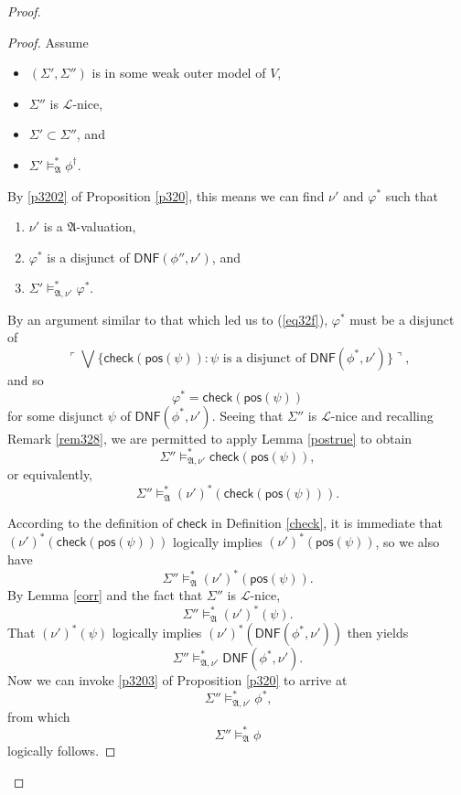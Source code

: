\documentclass[12pt, twoside]{memoir}
\numberwithin{equation}{section}
\theoremstyle{definition}
\theoremstyle{remark}
\theoremstyle{definition}
\theoremstyle{definition}
\theoremstyle{definition}
\theoremstyle{remark}
\begin{document}
\begin{proof}
\begin{enumerate}[label=Case \arabic*:, leftmargin=50pt]
    \begin{proof}
    Assume 
    \begin{itemize}
        \item $(\Sigma', \Sigma'')$ is in some weak outer model of $V$,
        \item $\Sigma''$ is $\mathcal{L}$-nice,
        \item $\Sigma' \subset \Sigma''$, and 
        \item $\Sigma' \models^{*}_{\mathfrak{A}} \phi^{\dagger}$.
    \end{itemize} 
    By \ref{p3202} of Proposition \ref{p320}, this means we can find $\nu'$ and $\varphi^*$ such that
    \begin{enumerate}[label=(\alph*)]
        \item $\nu'$ is a $\mathfrak{A}$-valuation, 
        \item $\varphi^*$ is a disjunct of $\mathsf{DNF}(\phi'', \nu')$, and
        \item $\Sigma' \models^{*}_{\mathfrak{A}, \nu'} \varphi^*$.
    \end{enumerate}
    By an argument similar to that which led us to (\ref{eq32f}), $\varphi^*$ must be a disjunct of 
    \begin{equation*}
        \ulcorner \bigvee \{\mathsf{check}(\mathsf{pos}(\psi)) : \psi \text{ is a disjunct of } \mathsf{DNF}(\phi^*, \nu')\} \urcorner \text{,}
    \end{equation*}
    and so 
    \begin{equation*}
        \varphi^* = \mathsf{check}(\mathsf{pos}(\psi))
    \end{equation*}
    for some disjunct $\psi$ of $\mathsf{DNF}(\phi^*, \nu')$. Seeing that $\Sigma''$ is $\mathcal{L}$-nice and recalling Remark \ref{rem328}, we are permitted to apply Lemma \ref{postrue} to obtain $$\Sigma'' \models^{*}_{\mathfrak{A}, \nu'} \mathsf{check}(\mathsf{pos}(\psi)),$$ or equivalently, $$\Sigma'' \models^{*}_{\mathfrak{A}} (\nu')^*(\mathsf{check}(\mathsf{pos}(\psi))).$$
    
    According to the definition of $\mathsf{check}$ in Definition \ref{check}, it is immediate that $(\nu')^*(\mathsf{check}(\mathsf{pos}(\psi)))$ logically implies $(\nu')^*(\mathsf{pos}(\psi))$, so we also have $$\Sigma'' \models^{*}_{\mathfrak{A}} (\nu')^*(\mathsf{pos}(\psi)).$$ By Lemma \ref{corr} and the fact that $\Sigma''$ is $\mathcal{L}$-nice, $$\Sigma'' \models^{*}_{\mathfrak{A}} (\nu')^*(\psi).$$ That $(\nu')^*(\psi)$ logically implies $(\nu')^*(\mathsf{DNF}(\phi^*, \nu'))$ then yields $$\Sigma'' \models^{*}_{\mathfrak{A}, \nu'} \mathsf{DNF}(\phi^*, \nu').$$ Now we can invoke \ref{p3203} of Proposition \ref{p320} to arrive at 
    \begin{equation*}
        \Sigma'' \models^{*}_{\mathfrak{A}, \nu'} \phi^* \text{,}
    \end{equation*}
    from which 
    \begin{equation*}
        \Sigma'' \models^{*}_{\mathfrak{A}} \phi
    \end{equation*}
    logically follows.
    \end{proof}


\end{enumerate}
\end{proof}
\end{document}
